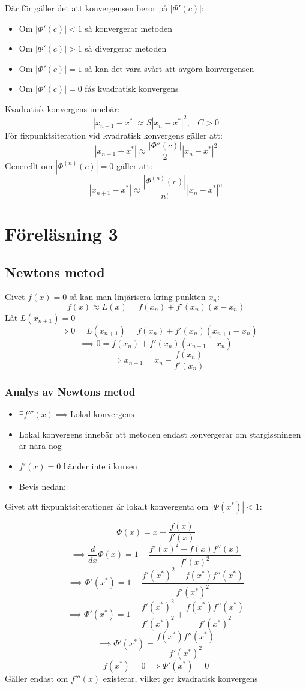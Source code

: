 \documentclass[a4paper,11pt]{article}
\begin{document}
Där för gäller det att konvergensen beror på $|\Phi'(c)|$:
\begin{itemize}
    \item Om $|\Phi'(c)| < 1$ så konvergerar metoden
    \item Om $|\Phi'(c)| > 1$ så divergerar metoden
    \item Om $|\Phi'(c)| = 1$ så kan det vara svårt att avgöra konvergensen
    \item Om $|\Phi'(c)| = 0$ fås kvadratisk konvergens
\end{itemize}

Kvadratisk konvergens innebär:
$$|x_{n+1} - x^*| \approx S|x_n - x^*|^2, \hspace{10pt} C > 0$$
För fixpunktsiteration vid kvadratisk konvergens gäller att:
$$|x_{n+1} - x^*| \approx \frac{|\Phi''(c)|}{2}|x_n - x^*|^2$$
Generellt om $|\Phi^{(n)}(c)| = 0$ gäller att:
$$|x_{n+1} - x^*| \approx \frac{|\Phi^{(n)}(c)|}{n!}|x_n - x^*|^n$$  

\newpage
\section{Föreläsning 3}
\subsection{Newtons metod}
Givet $f(x) = 0$ så kan man linjärisera kring punkten $x_n$:
$$f(x) \approx L(x) = f(x_n) + f'(x_n)(x - x_n)$$
Låt $L(x_{n+1}) = 0$
$$\implies 0 = L(x_{n+1}) = f(x_n) + f'(x_n)(x_{n+1} - x_n)$$
$$\implies 0 = f(x_n) + f'(x_n)(x_{n+1} - x_n)$$
$$\implies x_{n+1} = x_n - \frac{f(x_n)}{f'(x_n)}$$

\subsubsection{Analys av Newtons metod}
\begin{itemize}
    \item $\exists f'''(x) \implies \text{Lokal konvergens}$
    \item Lokal konvergens innebär att metoden endast konvergerar om stargissningen är nära nog
    \item $f'(x) = 0$ händer inte i kursen
    \item Bevis nedan:
\end{itemize}
\noindent Givet att fixpunktsiterationer är lokalt konvergenta om $|\Phi(x^*)| < 1$:

$$\Phi(x) = x - \frac{f(x)}{f'(x)}$$
$$\implies \frac{d}{dx}\Phi(x) = 1 - \frac{f'(x)^2 - f(x)f''(x)}{f'(x)^2}$$
$$\implies \Phi'(x^*) = 1 - \frac{f'(x^*)^2 - f(x^*)f''(x^*)}{f'(x^*)^2}$$
$$\implies \Phi'(x^*) = 1 - \frac{f'(x^*)^2}{f'(x^*)^2} + \frac{f(x^*)f''(x^*)}{f'(x^*)^2}$$
$$\implies \Phi'(x^*) = \frac{f(x^*)f''(x^*)}{f'(x^*)^2}$$
$$f(x^*) = 0 \implies \Phi'(x^*) = 0$$
Gäller endast om $f'''(x)$ existerar, vilket ger kvadratisk konvergens
\end{document}
